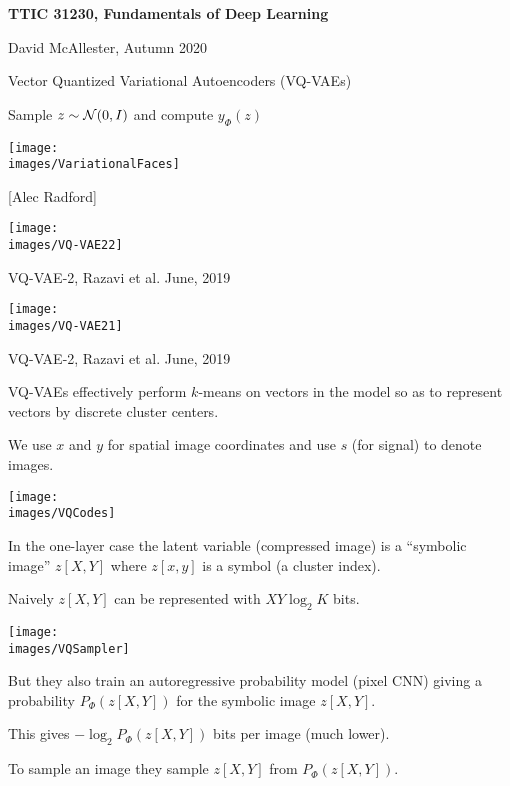 





{\Huge

  \centerline{\bf TTIC 31230, Fundamentals of Deep Learning}
  \bigskip
  \centerline{David McAllester, Autumn 2020}
  \vfill
  \vfil
  \centerline{Vector Quantized Variational Autoencoders (VQ-VAEs)}
  \vfill
  \vfill
  

\centerline{Sample {\color{red} $z \sim {\cal N}(0,I)$} and compute {\color{red} $y_\Phi(z)$}}

\vfill
\centerline{\texttt{[image: \\images/VariationalFaces]}}
\centerline{[Alec Radford]}


\centerline{\texttt{[image: \\images/VQ-VAE22]}}

\vfill
VQ-VAE-2, Razavi et al. June, 2019


\centerline{\texttt{[image: \\images/VQ-VAE21]}}

\vfill
VQ-VAE-2, Razavi et al. June, 2019


VQ-VAEs effectively perform $k$-means on vectors in the model so as to represent vectors by discrete cluster centers.

\vfill
We use $x$ and $y$ for spatial image coordinates and use $s$ (for signal) to denote images.


\centerline{\texttt{[image: \\images/VQCodes]}}

\vfill
In the one-layer case the latent variable (compressed image) is a ``symbolic image'' $z[X,Y]$ where $z[x,y]$ is a symbol (a cluster index).

\vfill
Naively $z[X,Y]$ can be represented with $XY \log_2 K$ bits.


\centerline{\texttt{[image: \\images/VQSampler]}}

But they also train an autoregressive probability model (pixel CNN) giving a probability $P_\Phi(z[X,Y])$ for the symbolic image $z[X,Y]$.

\vfill
This gives  $-\log_2 P_\Phi(z[X,Y])$ bits per image (much lower).

\vfill
To sample an image they sample $z[X,Y]$ from $P_\Phi(z[X,Y])$.


}
